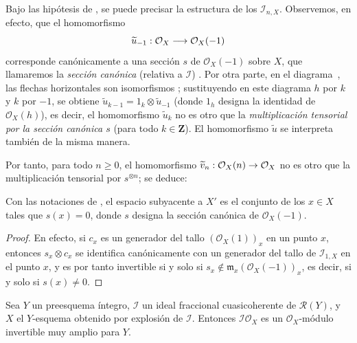 \documentclass[oneside,10pt]{amsart}
\makeatletter
\renewcommand{\geq}{\geqslant}
\newcommand{\ega@arrow}[2]{\mathchoice{#1}{#2}{#2}{#2}}
\renewcommand{\to}{\ega@arrow{\longrightarrow}{\rightarrow}}
\let\EGAOriginalLabel\label
\renewcommand{\label}[1]{\phantomsection\EGAOriginalLabel{#1}}
\makeatother
\begin{document}
\begin{env}[8.1.9]
\label{II.8.1.9-fr}
Bajo las hipótesis de , se puede precisar la estructura de los $\mathcal{I}_{n,X}$.
Observemos, en efecto, que el homomorfismo
\[
  \widetilde{u}_{-1}:\mathcal{O}_X\to\mathcal{O}_X(-1)
\]
corresponde canónicamente a una sección $s$ de $\mathcal{O}_X(-1)$ sobre $X$, que llamaremos la \emph{sección canónica} (relativa a $\mathcal{I}$) .
Por otra parte, en el diagrama~, las flechas horizontales son isomorfismos ; sustituyendo en este diagrama $h$ por $k$ y $k$ por $-1$, se obtiene $\widetilde{u}_{k-1}=1_k\otimes\widetilde{u}_{-1}$ (donde $1_h$ designa la identidad de $\mathcal{O}_X(h)$), es decir, el homomorfismo $\widetilde{u}_k$ no es otro que la \emph{multiplicación tensorial por la sección canónica $s$} (para todo $k\in\mathbf{Z}$).
El homomorfismo $\widetilde{u}$  se interpreta también de la misma manera.

Por tanto, para todo $n\geq0$, el homomorfismo $\widetilde{v}_n:\mathcal{O}_X(n)\to\mathcal{O}_X$ no es otro que la multiplicación tensorial por $s^{\otimes n}$; se deduce:
\end{env}

\begin{corollary}[8.1.10]
\label{II.8.1.10-fr}
Con las notaciones de , el espacio subyacente a $X'$ es el conjunto de los $x\in X$ tales que $s(x)=0$, donde $s$ designa la sección canónica de $\mathcal{O}_X(-1)$.
\end{corollary}

\begin{proof}
En efecto, si $c_x$ es un generador del tallo $(\mathcal{O}_X(1))_x$ en un punto $x$, entonces $s_x\otimes c_x$ se identifica canónicamente con un generador del tallo de $\mathcal{I}_{1,X}$ en el punto $x$, y es por tanto invertible si y solo si $s_x\notin\mathfrak{m}_x(\mathcal{O}_X(-1))_x$, es decir, si y solo si $s(x)\neq0$.
\end{proof}

\begin{proposition}[8.1.11]
\label{II.8.1.11-fr}
Sea $Y$ un preesquema íntegro, $\mathcal{I}$ un ideal fraccional cuasicoherente de $\mathcal{R}(Y)$, y $X$ el $Y$-esquema obtenido por explosión de $\mathcal{I}$.
Entonces $\mathcal{I}\mathcal{O}_X$ es un $\mathcal{O}_X$-módulo invertible muy amplio para $Y$.
\end{proposition}
\end{document}
